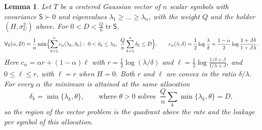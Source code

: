 \documentclass[11pt,onecolumn]{IEEEtran}
\newtheorem{lemma}[theorem]{Lemma}
\newcommand{\tr}{\operatorname{tr}}
\begin{document}
\begin{lemma}\label{lem:separable}
Let $T$ be a centered Gaussian vector of $n$ scalar symbols with
covariance $\mathsf S\succ0$ and eigenvalues
$\lambda_1\ge\dots\ge\lambda_n$, with the weight $Q$ and the holder
$(H,\sigma_U^2)$ above. For $0<D<\tfrac Qn\tr\mathsf S$,
\[
\mathsf V_{\mathsf S}(\alpha,D)=\frac1n\min\Bigl\{\sum_{k=1}^nc_\alpha(\lambda_k,\delta_k):\ 0<\delta_k\le\lambda_k,\ \frac Qn\sum_{k=1}^n\delta_k\le D\Bigr\},
\qquad
c_\alpha(\lambda,\delta)=\frac12\log\frac\lambda\delta+\frac{1-\alpha}2\log\frac{1+J\delta}{1+J\lambda}.
\]
Here $c_\alpha=\alpha r+(1-\alpha)\ell$ with $r=\tfrac12\log(\lambda/\delta)$
and $\ell=\tfrac12\log\frac{1/\delta+J}{1/\lambda+J}$, and $0\le\ell\le r$,
with $\ell=r$ when $H=0$. Both $r$ and $\ell$ are convex in the ratio
$\delta/\lambda$. For every $\alpha$ the minimum is attained at the same
allocation
\[
\delta_k=\min\{\lambda_k,\theta\},\qquad\text{where }\theta>0\text{ solves }\ \frac Qn\sum_k\min\{\lambda_k,\theta\}=D,
\]
so the region of the vector problem is the quadrant above the rate and
the leakage per symbol of this allocation.
\end{lemma}
\end{document}
